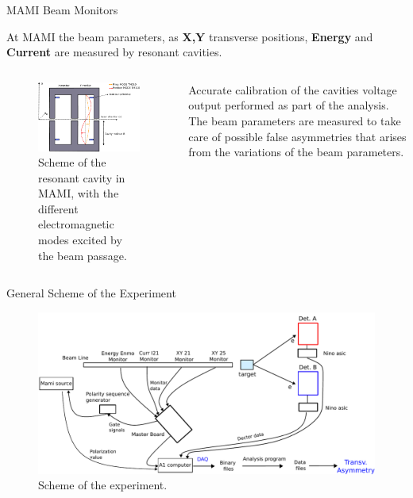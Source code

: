 \documentclass[9pt,a4paper]{beamer}
\begin{document}
\begin{frame}[t]{MAMI Beam Monitors}

At MAMI the beam parameters, as \textbf{X,Y} transverse positions, \textbf{Energy} and \textbf{Current} are measured by resonant cavities.

\begin{columns}[T]
\begin{column}{0.60\textwidth}
\begin{center}
\begin{figure}
\includegraphics[width = 1\textwidth]{figures/Monitors.pdf}
\caption{Scheme of the resonant cavity in MAMI, with the different electromagnetic modes excited by the beam passage.}
\end{figure}
\end{center}
\end{column}
\begin{column}{0.40\textwidth}
Accurate calibration of the cavities voltage output performed as part of the analysis.
The beam parameters are measured to take care of possible false asymmetries that arises from the variations of the beam parameters.
\end{column}
\end{columns}
\end{frame}

\begin{frame}{General Scheme of the Experiment}

\begin{figure}[hbtp]
\centering
\includegraphics[width = 1\textwidth]{figures/Electronic_scheme.pdf}
\caption{Scheme of the experiment.}
\end{figure}
\end{frame}
\end{document}
